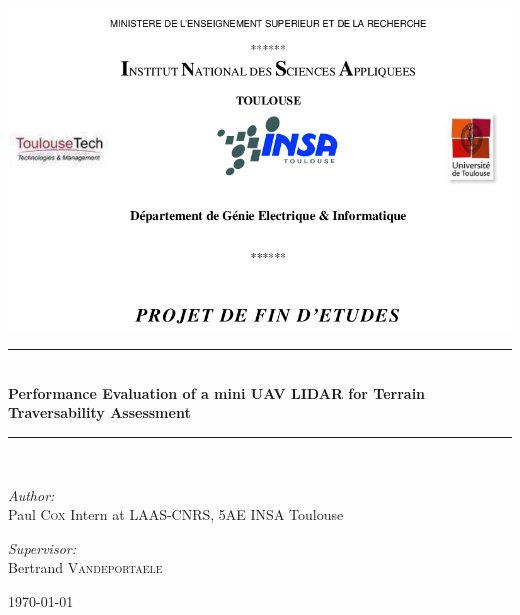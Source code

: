 \documentclass[a4paper,11pt]{report}
\newcommand{\HRule}{\rule{\linewidth}{0.5mm}}
\begin{document}
\begin{titlepage}

\begin{center}

\includegraphics[width=18cm]{title_top.png}

\HRule \\[0.4cm]
{ \huge \bfseries Performance Evaluation of a mini UAV LIDAR for Terrain Traversability Assessment}\\[0.4cm]

\HRule \\[1.5cm]

\begin{minipage}{0.4\textwidth}
\begin{flushleft} \large
\emph{Author:}\\
Paul \textsc{Cox} Intern at LAAS-CNRS, 5AE INSA Toulouse
\end{flushleft}
\end{minipage}
\begin{minipage}{0.4\textwidth}
\begin{flushright} \large
\emph{Supervisor:} \\
Bertrand \textsc{Vandeportaele}
\end{flushright}
\end{minipage}

\vfill

{\large \today}

\end{center}

\end{titlepage}
\end{document}
